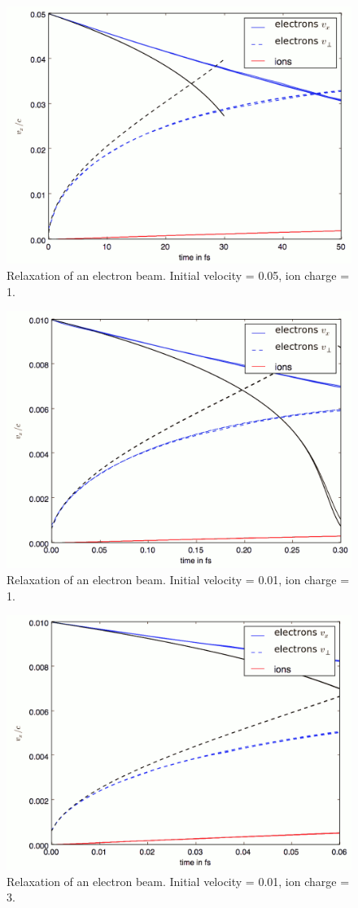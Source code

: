\documentclass[11pt]{article}
\begin{document}
\begin{figure}[h]
\centering
\includegraphics[width=12cm]{beam_relaxation123}
\caption{Relaxation of an electron beam. Initial velocity = 0.05, ion charge = 1.}
\label{beam1}
\end{figure}
\begin{figure}[h]
\centering
\includegraphics[width=12cm]{beam_relaxation456}
\caption{Relaxation of an electron beam. Initial velocity = 0.01, ion charge = 1.}
\label{beam2}
\end{figure}
\begin{figure}[h]
\centering
\includegraphics[width=12cm]{beam_relaxation789}
\caption{Relaxation of an electron beam. Initial velocity = 0.01, ion charge = 3.}
\label{beam3}
\end{figure}
\end{document}
